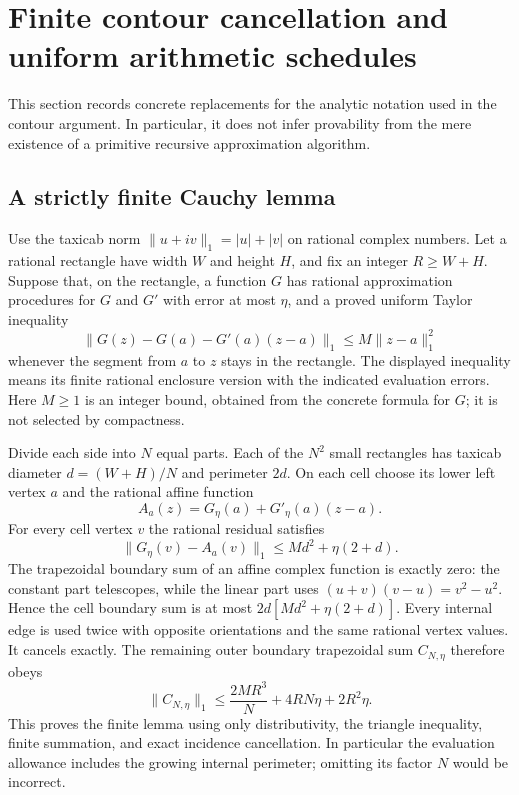 \section{Finite contour cancellation and uniform arithmetic schedules}
\label{sec:finite-contour-audit}

This section records concrete replacements for the analytic notation used
in the contour argument. In particular, it does not infer provability from
the mere existence of a primitive recursive approximation algorithm.

\subsection{A strictly finite Cauchy lemma}

Use the taxicab norm $\lVert u+iv\rVert_1=|u|+|v|$ on rational complex
numbers. Let a rational rectangle have width $W$ and height $H$, and fix
an integer $R\ge W+H$. Suppose that, on the rectangle, a function $G$
has rational approximation procedures for $G$ and $G'$ with error at most
$\eta$, and a proved uniform Taylor inequality
\[
 \lVert G(z)-G(a)-G'(a)(z-a)\rVert_1
       \le M\lVert z-a\rVert_1^2
\]
whenever the segment from $a$ to $z$ stays in the rectangle. The displayed
inequality means its finite rational enclosure version with the indicated
evaluation errors. Here $M\ge1$ is an integer bound, obtained from the
concrete formula for $G$; it is not selected by compactness.

Divide each side into $N$ equal parts. Each of the $N^2$ small rectangles
has taxicab diameter $d=(W+H)/N$ and perimeter $2d$. On each cell choose
its lower left vertex $a$ and the rational affine function
\[
 A_a(z)=G_\eta(a)+G'_\eta(a)(z-a).
\]
For every cell vertex $v$ the rational residual satisfies
\[
 \lVert G_\eta(v)-A_a(v)\rVert_1
       \le Md^2+\eta(2+d).
\]
The trapezoidal boundary sum of an affine complex function is exactly
zero: the constant part telescopes, while the linear part uses
$(u+v)(v-u)=v^2-u^2$. Hence the cell boundary sum is at most
$2d[Md^2+\eta(2+d)]$. Every internal edge is used twice with opposite
orientations and the same rational vertex values. It cancels exactly.
The remaining outer boundary trapezoidal sum $C_{N,\eta}$ therefore obeys
\begin{equation}\label{eq:finite-rectangle}
 \lVert C_{N,\eta}\rVert_1
 \le \frac{2MR^3}{N}+4RN\eta+2R^2\eta.
\end{equation}
This proves the finite lemma using only distributivity, the triangle
inequality, finite summation, and exact incidence cancellation. In
particular the evaluation allowance includes the growing internal
perimeter; omitting its factor $N$ would be incorrect.

